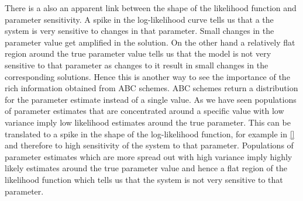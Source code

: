 There is a also an apparent link between the shape of the likelihood function and parameter sensitivity. A spike in the log-likelihood curve tells us that a the system is very sensitive to changes in that parameter. Small changes in the parameter value get amplified in the solution. On the other hand a relatively flat region around the true parameter value tells us that the model is not very sensitive to that parameter as changes to it result in small changes in the corresponding solutions. Hence this is another way to see the importance of the rich information obtained from ABC schemes. ABC schemes return a distribution for the parameter estimate instead of a single value. As we have seen populations of parameter estimates that are concentrated around a specific value with low variance imply low likelihood estimates around the true parameter. This can be translated to a spike in the shape of the log-likelihood function, for example in \ref{} and therefore to high sensitivity of the system to that parameter. Populations of parameter estimates which are more spread out with high variance imply highly likely estimates around the true parameter value and hence a flat region of the likelihood function which tells us that the system is not very sensitive to that parameter.


